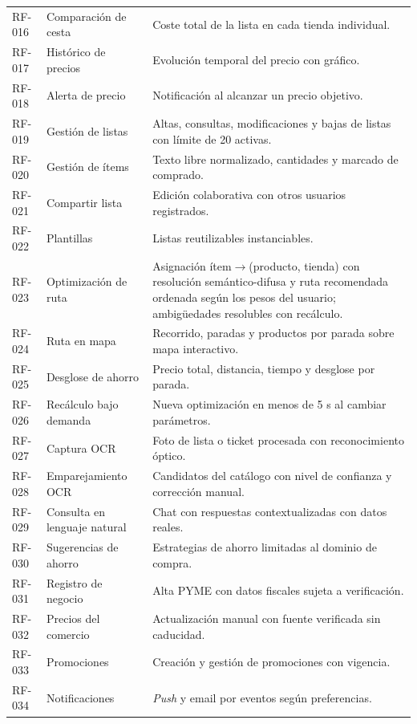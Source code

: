 \begin{small}
\begin{longtable}{@{}p{2.1cm}p{4.2cm}p{7.6cm}@{}}
RF-016 & Comparaci\'on de cesta & Coste total de la lista en cada tienda individual. \\
RF-017 & Hist\'orico de precios & Evoluci\'on temporal del precio con gr\'afico. \\
RF-018 & Alerta de precio & Notificaci\'on al alcanzar un precio objetivo. \\
RF-019 & Gesti\'on de listas & Altas, consultas, modificaciones y bajas de listas con l\'imite de 20 activas. \\
RF-020 & Gesti\'on de \'items & Texto libre normalizado, cantidades y marcado de comprado. \\
RF-021 & Compartir lista & Edici\'on colaborativa con otros usuarios registrados. \\
RF-022 & Plantillas & Listas reutilizables instanciables. \\
RF-023 & Optimizaci\'on de ruta & Asignaci\'on \'item$\to$(producto, tienda) con resoluci\'on sem\'antico-difusa y ruta recomendada ordenada seg\'un los pesos del usuario; ambig\"uedades resolubles con rec\'alculo. \\
RF-024 & Ruta en mapa & Recorrido, paradas y productos por parada sobre mapa interactivo. \\
RF-025 & Desglose de ahorro & Precio total, distancia, tiempo y desglose por parada. \\
RF-026 & Rec\'alculo bajo demanda & Nueva optimizaci\'on en menos de 5 s al cambiar par\'ametros. \\
RF-027 & Captura OCR & Foto de lista o ticket procesada con reconocimiento \'optico. \\
RF-028 & Emparejamiento OCR & Candidatos del cat\'alogo con nivel de confianza y correcci\'on manual. \\
RF-029 & Consulta en lenguaje natural & Chat con respuestas contextualizadas con datos reales. \\
RF-030 & Sugerencias de ahorro & Estrategias de ahorro limitadas al dominio de compra. \\
RF-031 & Registro de negocio & Alta PYME con datos fiscales sujeta a verificaci\'on. \\
RF-032 & Precios del comercio & Actualizaci\'on manual con fuente verificada sin caducidad. \\
RF-033 & Promociones & Creaci\'on y gesti\'on de promociones con vigencia. \\
RF-034 & Notificaciones & \emph{Push} y email por eventos seg\'un preferencias. \\
\end{longtable}
\end{small}

